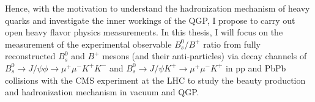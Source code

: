 Hence, with the motivation to understand the hadronization mechanism of heavy quarks and investigate the inner workings of the QGP, I propose to carry out open heavy flavor physics measurements. In this thesis, I will focus on the measurement of the experimental observable $B^0_s/B^+$ ratio from fully reconstructed $B^0_s$ and $B^+$ mesons (and their anti-particles) via decay channels of $B^0_s \rightarrow J/\psi \phi \rightarrow \mu^+ \mu^- K^+ K^-$ and $B^0_s \rightarrow J/\psi K^+ \rightarrow \mu^+ \mu^- K^+$ in pp and PbPb collisions with the CMS experiment at the LHC to study the beauty production and hadronization mechanism in vacuum and QGP. 


